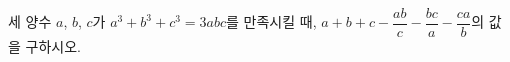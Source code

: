 세 양수 $a$, $b$, $c$가 $a^3+b^3+c^3=3abc$를 만족시킬 때, $a+b+c-\dfrac{ab}{c}-\dfrac{bc}{a}-\dfrac{ca}{b}$의 값을 구하시오.
